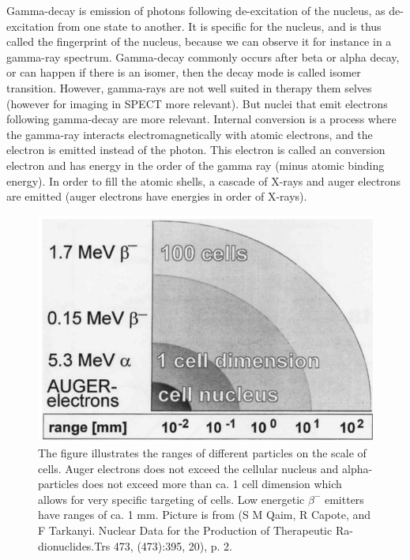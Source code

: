 Gamma-decay is emission of photons following de-excitation of the nucleus, as de-excitation from one state to another. It is specific for the nucleus, and is thus called the fingerprint of the nucleus, because we can observe it for instance in a gamma-ray spectrum. Gamma-decay commonly occurs after beta or alpha decay, or can happen if there is an isomer, then the decay mode is called isomer transition. However, gamma-rays are not well suited in therapy them selves (however for imaging in SPECT more relevant). But nuclei that emit electrons following gamma-decay are more relevant. Internal conversion is a process where the gamma-ray interacts electromagnetically with atomic electrons, and the electron is emitted instead of the photon. This electron is called an conversion electron and has energy in the order of the gamma ray (minus atomic binding energy). In order to fill the atomic shells, a cascade of X-rays and auger electrons are emitted (auger electrons have energies in order of X-rays). 


\begin{figure}
    \centering
    \includegraphics{Theory/cell_dimension.png}
    \caption{The figure illustrates the ranges of different particles on the scale of cells. Auger electrons does not exceed the cellular nucleus and alpha-particles does not exceed more than ca. 1 cell dimension which allows for very specific targeting of cells. Low energetic $\beta^-$ emitters have ranges of ca. 1 mm. Picture is from (S M Qaim, R Capote, and F Tarkanyi.  Nuclear Data for the Production of Therapeutic Ra-dionuclides.Trs 473, (473):395, 20), p. 2. }
    \label{fig:cell_dimension}
\end{figure}



